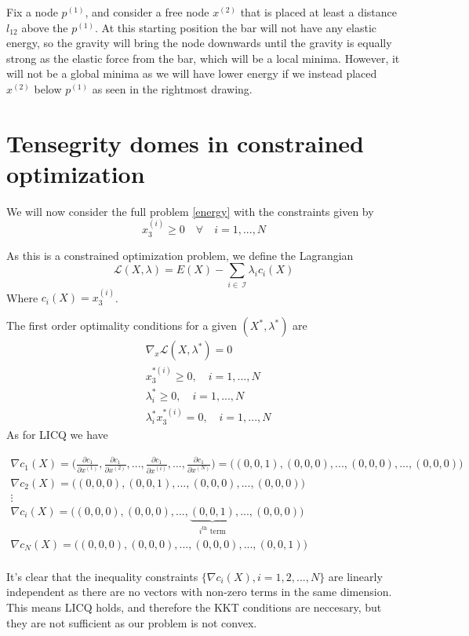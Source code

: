 Fix a node $p^{(1)}$, and consider a free node $x^{(2)}$ that is placed at least a distance $l_{12}$ above the $p^{(1)}$. At this starting position the bar will not have any elastic energy, so the gravity will bring the node downwards until the gravity is equally strong as the elastic force from the bar, which will be a local minima. However, it will not be a global minima as we will have lower energy if we instead placed $x^{(2)}$ below $p^{(1)}$ as seen in the rightmost drawing. 



\section{Tensegrity domes in constrained optimization}
We will now consider the full problem \eqref{energy} with the constraints given by 
\begin{equation}
    x_3^{(i)} \geq 0 \quad \forall \quad i = 1,...,N
\end{equation}

As this is a constrained optimization problem, we define the Lagrangian \begin{equation}
    \mathcal{L}(X,\lambda) = E(X) - \sum_{i \in \ \mathcal{I}}\lambda_i c_i(X)
\end{equation}
Where $c_i(X) = x^{(i)}_3$.

The first order optimality conditions for a given $(X^*,\lambda^*)$ are \begin{equation}
\begin{aligned}
       &\nabla_x \mathcal{L}(X,\lambda^*)=0\\ 
       &x^{*(i)}_3 \geq 0,\quad i = 1,...,N\\
       &\lambda_i^* \geq 0 ,\quad i = 1,...,N\\
       & \lambda_i^* x^{*(i)}_3 = 0,\quad i = 1,...,N
\end{aligned}
\end{equation}
As for LICQ we have 

\begin{align*}
    \nabla c_1(X) = \bigg( \frac{\partial c_1}{\partial x^{(1)}},\frac{\partial c_1}{\partial x^{(2)}},...,\frac{\partial c_1}{\partial x^{(i)}},...,\frac{\partial c_1}{\partial x^{(N)}} \bigg) =\bigg( (0,0,1),(0,0,0),...,(0,0,0),...,(0,0,0) \bigg) \\
    \nabla c_2(X) = \bigg( (0,0,0),(0,0,1),...,(0,0,0),...,(0,0,0) \bigg) \\
    \vdots 
    \hspace{200pt}\\
    \nabla c_i(X) = \bigg( (0,0,0),(0,0,0),...,\underbrace{(0,0,1)}_{i^{\text{th}}\text{ term}},...,(0,0,0) \bigg)\\
    \nabla c_N(X) = \bigg( (0,0,0),(0,0,0),...,(0,0,0),...,(0,0,1) \bigg) \\
\end{align*}

It's clear that the inequality constraints $\{\nabla c_i(X),i=1,2,...,N\}$ are linearly independent as there are no vectors with non-zero terms in the same dimension. This means LICQ holds, and therefore the KKT conditions are neccesary, but they are not sufficient as our problem is not convex.